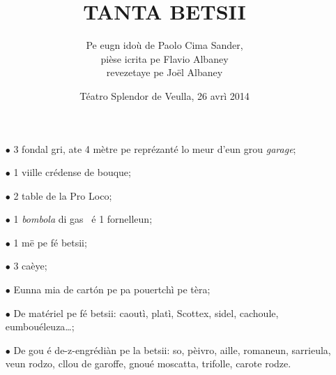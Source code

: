 \title{TANTA BETSII}

\author{Pe eugn idoù de Paolo Cima Sander,\\ pièse icrita pe Flavio Albaney\\  revezetaye pe Joël Albaney}
\date{Téatro Splendor de Veulla, 26 avrì 2014}

\maketitle







\Scenographie
\begin{itemize}
\item[$\bullet$] 3 fondal gri, ate 4 mètre pe reprézanté lo meur d'eun grou \textit{garage};
\item[$\bullet$] 1 viille crédense de bouque;
\item[$\bullet$] 2 table de la Pro Loco;
\item[$\bullet$] 1 \textit{bombola} di gas \gas\ é 1 fornelleun;
\item[$\bullet$] 1 më pe fé betsii;
\item[$\bullet$] 3 caèye;
\item[$\bullet$] Eunna mia de cart\'on pe pa pouertchì pe tèra;
\item[$\bullet$] De matériel pe fé betsii: caoutì, platì, Scottex, sidel, cachoule, eumbouéleuza\ldots ;
\item[$\bullet$] De gou é de-z-engrédiàn pe la betsii: so, pèivro, aille, romaneun,  sarrieula, veun rodzo, cllou de garoffe, gnoué moscatta, trifolle, carote rodze.
\end{itemize}

\setlength{\lengthchar}{2.5 cm}



